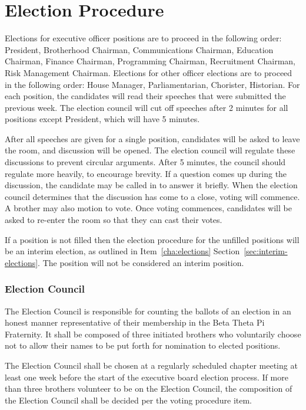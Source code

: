 \chapter{Election Procedure}
\label{election-procedure}

Elections for executive officer positions are to proceed in the following order:
President, Brotherhood Chairman, Communications Chairman, Education Chairman,
Finance Chairman, Programming Chairman, Recruitment Chairman, Risk Management
Chairman.
Elections for other officer elections are to proceed in the following order:
House Manager, Parliamentarian, Chorister, Historian.
For each position, the candidates will read their speeches that were submitted
the previous week.
The election council will cut off speeches after 2 minutes for all positions
except President, which will have 5 minutes.

After all speeches are given for a single position, candidates will be asked to
leave the room, and discussion will be opened.
The election council will regulate these discussions to prevent circular
arguments.
After 5 minutes, the council should regulate more heavily, to encourage brevity.
If a question comes up during the discussion, the candidate may be called in to
answer it briefly.
When the election council determines that the discussion has come to a close,
voting will commence.
A brother may also motion to vote.
Once voting commences, candidates will be asked to re-enter the room so that
they can cast their votes.

If a position is not filled then the election procedure for the unfilled
positions will be an interim election, as outlined in Item~\ref{cha:elections}
Section~\ref{sec:interim-elections}.
The position will not be considered an interim position.

\subsection{Election Council}
\label{sec:election-council}

The Election Council is responsible for counting the ballots of an election in
an honest manner representative of their membership in the Beta Theta Pi
Fraternity.
It shall be composed of three initiated brothers who voluntarily choose not to
allow their names to be put forth for nomination to elected positions.

The Election Council shall be chosen at a regularly scheduled chapter meeting at
least one week before the start of the executive board election process.
If more than three brothers volunteer to be on the Election Council, the
composition of the Election Council shall be decided per the voting procedure
item.

